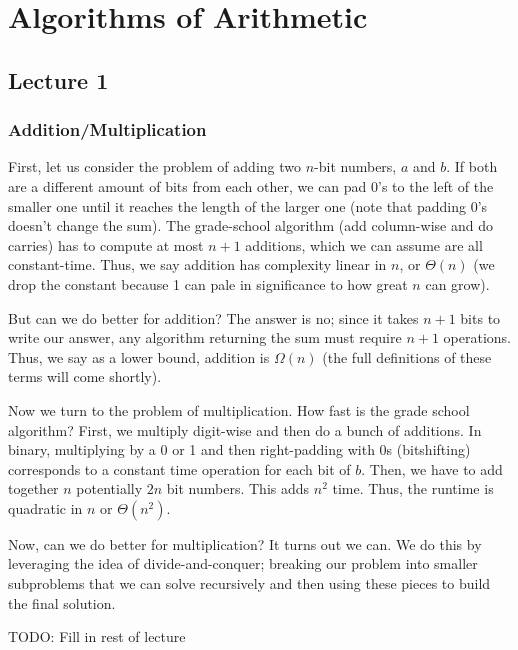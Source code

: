 \section{Algorithms of Arithmetic}

\subsection{Lecture 1}

\subsubsection{Addition/Multiplication}

First, let us consider the problem of adding two $n$-bit numbers, $a$ and $b$. If both are a different amount of bits from each other,
we can pad 0's to the left of the smaller one until it reaches the length of the larger one (note that padding 0's doesn't change the sum).
The grade-school algorithm (add column-wise and do carries)
has to compute at most $n + 1$ additions, which we can assume are all constant-time. Thus, we say addition has complexity linear in $n$,
or $\Theta(n)$ (we drop the constant because 1 can pale in significance to how great $n$ can grow).

But can we do better for addition? The answer is no; since it takes $n + 1$ bits to write our answer, any algorithm returning the sum
must require $n + 1$ operations. Thus, we say as a lower bound, addition is $\Omega(n)$ (the full definitions of these terms will come shortly).

Now we turn to the problem of multiplication. How fast is the grade school algorithm? First, we multiply digit-wise and then do a bunch of additions.
In binary, multiplying by a 0 or 1 and then right-padding with 0s (bitshifting) corresponds to a constant time operation for each bit of $b$.
Then, we have to add together $n$ potentially $2n$ bit numbers. This adds $n^2$ time. Thus, the runtime is quadratic in $n$
or $\Theta(n^2)$.

Now, can we do better for multiplication? It turns out we can. We do this by leveraging the idea of divide-and-conquer;
breaking our problem into smaller subproblems that we can solve recursively and then using these pieces to build the final solution.

TODO: Fill in rest of lecture